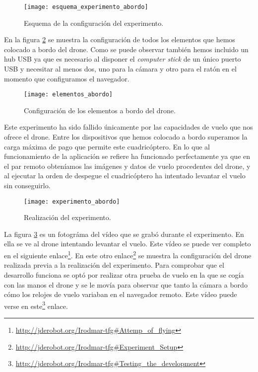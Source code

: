 \begin{figure}[h!]
\centering
\texttt{[image: esquema\_experimento\_abordo]}
\caption{Esquema de la configuración del experimento.}
\label{fig:esquemaexperimentoabordo}
\end{figure}


En la figura \ref{fig:elementosabordo} se muestra la configuración de todos los elementos que hemos colocado a bordo del drone. Como se puede observar también hemos incluido un hub USB ya que es necesario al disponer el \emph{computer stick} de un único puerto USB y necesitar al menos dos, uno para la cámara y otro para el ratón en el momento que configuramos el navegador.\\

\begin{figure}[h!]
\centering
\texttt{[image: elementos\_abordo]}
\caption{Configuración de los elementos a bordo del drone.}
\label{fig:elementosabordo}
\end{figure}


Este experimento ha sido fallido únicamente por las capacidades de vuelo que nos ofrece el drone. Entre los dispositivos que hemos colocado a bordo superamos la carga máxima de pago que permite este cuadricóptero. En lo que al funcionamiento de la aplicación se refiere ha funcionado perfectamente ya que en el par remoto obteníamos las imágenes y datos de vuelo procedentes del drone, y al ejecutar la orden de despegue el cuadricóptero ha intentado levantar el vuelo sin conseguirlo.\\

\begin{figure}[h!]
\centering
\texttt{[image: experimento\_abordo]}
\caption{Realización del experimento.}
\label{fig:experimentoabordo}
\end{figure}

La figura \ref{fig:experimentoabordo} es un fotográma del vídeo que se grabó durante el experimento. En ella se ve al drone intentando levantar el vuelo. Este vídeo se puede ver completo en el siguiente enlace\footnote{\url{http://jderobot.org/Irodmar-tfg#Attemp_of_flying}}. En este otro enlace\footnote{\url{http://jderobot.org/Irodmar-tfg#Experiment_Setup}} se muestra la configuración del drone realizada previa a la realización del experimento. Para comprobar que el desarrollo funciona se optó por realizar otra prueba de vuelo en la que se cogía con las manos el drone y se le movía para observar que tanto la cámara a bordo cómo los relojes de vuelo variaban en el navegador remoto. Este vídeo puede verse en este\footnote{\url{http://jderobot.org/Irodmar-tfg#Testing_the_development}} enlace.\\



